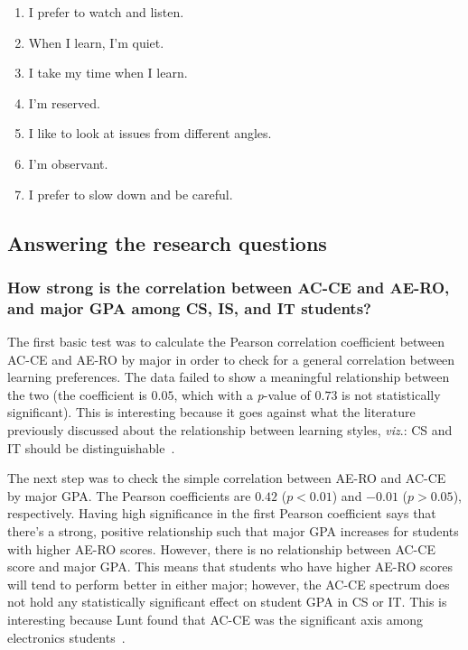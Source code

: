 \begin{enumerate}
  \begin{enumerate}
    \item I prefer to watch and listen.
    \item When I learn, I'm quiet.
    \item I take my time when I learn.
    \item I'm reserved.
    \item I like to look at issues from different angles.
    \item I'm observant.
    \item I prefer to slow down and be careful.
  \end{enumerate}
\end{enumerate}

\subsection{Answering the research questions}
\subsubsection{How strong is the correlation between AC-CE and AE-RO, and major GPA among CS, IS, and IT students?}
The first basic test was to calculate the Pearson correlation coefficient between AC-CE and AE-RO by major in order to check for a general correlation between learning preferences. The data failed to show a meaningful relationship between the two (the coefficient is $0.05$, which with a \textit{p}-value of $0.73$ is not statistically significant). This is interesting because it goes against what the literature previously discussed about the relationship between learning styles, \textit{viz}.: CS and IT should be distinguishable~\citep{kolb2005}.

The next step was to check the simple correlation between AE-RO and AC-CE by major GPA. The Pearson coefficients are $0.42$ ($p<0.01$) and $-0.01$ ($p>0.05$), respectively. Having high significance in the first Pearson coefficient says that there's a strong, positive relationship such that major GPA increases for students with higher AE-RO scores. However, there is no relationship between AC-CE score and major GPA. This means that students who have higher AE-RO scores will tend to perform better in either major; however, the AC-CE spectrum does not hold any statistically significant effect on student GPA in CS or IT. This is interesting because Lunt found that AC-CE was the significant axis among electronics students~\citep{lunt1996}.

